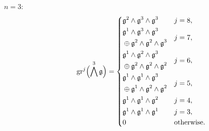 \begin{description}
  \item[$n=3:$]
        \begin{equation*}
          \operatorname{gr}^{j}\Bigl( \bigwedge^{3}\mathfrak{g} \Bigr) =
          \begin{dcases}
            \mathfrak{g}^{2} \wedge \mathfrak{g}^{3} \wedge \mathfrak{g}^{3} & j=8,                                                                                                                   \\
            \!\begin{aligned} & \mathfrak{g}^{1} \wedge \mathfrak{g}^{3} \wedge \mathfrak{g}^{3} \\ & \oplus \mathfrak{g}^{2} \wedge \mathfrak{g}^{2} \wedge \mathfrak{g}^{3} \end{aligned} & j=7, \\
            \!\begin{aligned} & \mathfrak{g}^{1} \wedge \mathfrak{g}^{2} \wedge \mathfrak{g}^{3} \\ & \oplus \mathfrak{g}^{2} \wedge \mathfrak{g}^{2} \wedge \mathfrak{g}^{2} \end{aligned} & j=6, \\
            \!\begin{aligned} & \mathfrak{g}^{1} \wedge \mathfrak{g}^{1} \wedge \mathfrak{g}^{3} \\ & \oplus \mathfrak{g}^{1} \wedge \mathfrak{g}^{2} \wedge \mathfrak{g}^{2} \end{aligned} & j=5, \\
            \mathfrak{g}^{1} \wedge \mathfrak{g}^{1} \wedge \mathfrak{g}^{2}                                                                                                & j=4, \\
            \mathfrak{g}^{1} \wedge \mathfrak{g}^{1} \wedge \mathfrak{g}^{1}                                                                                                & j=3, \\
            0                                                                                                                                              & \text{otherwise.}
          \end{dcases}
        \end{equation*}


\end{description}
